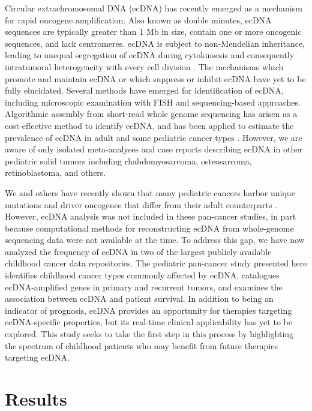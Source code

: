 Circular extrachromosomal DNA (ecDNA) has recently emerged as a mechanism for rapid oncogene amplification. Also known as double minutes, ecDNA sequences are typically greater than 1 Mb in size, contain one or more oncogenic sequences, and lack centromeres. ecDNA is subject to non-Mendelian inheritance, leading to unequal segregation of ecDNA during cytokinsesis and consequently intratumoral heterogeneity with every cell division \cite{bafna_2022}. The mechanisms which promote and maintain ecDNA or which suppress or inhibit ecDNA have yet to be fully elucidated. Several methods have emerged for identification of ecDNA, including microscopic examination with FISH and sequencing-based approaches. Algorithmic assembly from short-read whole genome sequencing has arisen as a cost-effective method to identify ecDNA, and has been applied to estimate the prevalence of ecDNA in adult \cite{Kim_2020,pongor_2023,luebeck_2022} and some pediatric cancer types \cite{Koche_2020,Chapman}. However, we are aware of only isolated meta-analyses \cite{gebhart_2005} and case reports describing ecDNA in other pediatric solid tumors including rhabdomyosarcoma, osteosarcoma, retinoblastoma, and others. 

We and others have recently shown that many pediatric cancers harbor unique mutations and driver oncogenes that differ from their adult counterparts \cite{grobner_2018,ma_2018}. However, ecDNA analysis was not included in these pan-cancer studies, in part because computational methods for reconstructing ecDNA from whole-genome sequencing data were not available at the time.  To address this gap, we have now analyzed the frequency of ecDNA in two of the largest publicly available childhood cancer data repositories. The pediatric pan-cancer study presented here identifies childhood cancer types commonly affected by ecDNA, catalogues ecDNA-amplified genes in primary and recurrent tumors, and examines the association between ecDNA and patient survival. In addition to being an indicator of prognosis, ecDNA provides an opportunity for therapies targeting ecDNA-specific properties, but its real-time clinical applicability has yet to be explored. This study seeks to take the first step in this process by highlighting the spectrum of childhood patients who may benefit from future therapies targeting ecDNA. 

\section{Results}

